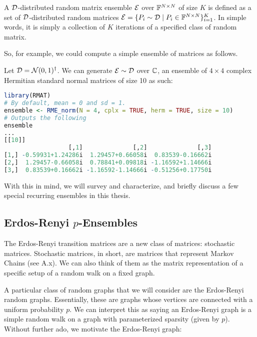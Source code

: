 \begin{definition}
A $\mathcal{D}$-distributed random matrix ensemble $\mathcal{E}$ over $\mathbb{F}^{N \times N}$ of size $K$ is defined as a set of $\mathcal{D}$-distributed random matrices $\mathcal{E} = \{P_i \sim \mathcal{D} \mid P_i \in \mathbb{F}^{N \times N}\}_{i = 1}^K$. In simple words, it is simply a collection of $K$ iterations of a specified class of random matrix.
\end{definition}

\medskip
\noindent So, for example, we could compute a simple ensemble of matrices as follows.
\begin{code}
Let $\mathcal{D} = \mathcal{N}(0,1)^{\dagger}$. We can generate $\mathcal{E} \sim \mathcal{D}$ over $\mathbb{C}$, an ensemble of $4 \times 4$ complex Hermitian standard normal matrices of size 10 as such:
\end{code}

\begin{lstlisting}[language=R]
library(RMAT)
# By default, mean = 0 and sd = 1.
ensemble <- RME_norm(N = 4, cplx = TRUE, herm = TRUE, size = 10)
# Outputs the following
ensemble
...
[[10]]
                  [,1]              [,2]              [,3]
[1,] -0.59931+1.24286i  1.29457+0.66058i  0.83539-0.16662i
[2,]  1.29457-0.66058i  0.78841+0.09818i -1.16592+1.14666i
[3,]  0.83539+0.16662i -1.16592-1.14666i -0.51256+0.17750i
\end{lstlisting}

With this in mind, we will survey and characterize, and briefly discuss a few special recurring ensembles in this thesis.


\subsection{Erdos-Renyi $p$-Ensembles}

The Erdos-Renyi transition matrices are a new class of matrices: stochastic matrices. Stochastic matrices, in short, are matrices that represent Markov Chains (see A.x).
We can also think of them as the matrix representation of a specific setup of a random walk on a fixed graph.

A particular class of random graphs that we will consider are the Erdos-Renyi random graphs. Essentially, these are graphs whose vertices are connected with a uniform probability $p$. We can interpret this as saying an Erdos-Renyi graph is a simple random walk on a graph with parameterized sparsity (given by $p$). Without further ado, we motivate the Erdos-Renyi graph:

